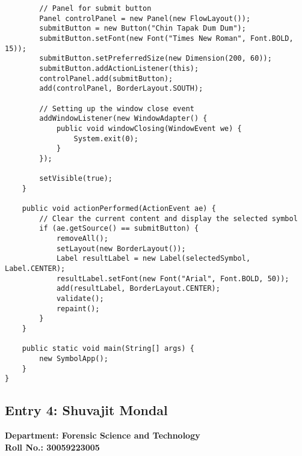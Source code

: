 \documentclass[a4paper,12pt]{article}
\begin{document}
\begin{verbatim}
        // Panel for submit button
        Panel controlPanel = new Panel(new FlowLayout());
        submitButton = new Button("Chin Tapak Dum Dum");
        submitButton.setFont(new Font("Times New Roman", Font.BOLD, 15));
        submitButton.setPreferredSize(new Dimension(200, 60));
        submitButton.addActionListener(this);
        controlPanel.add(submitButton);
        add(controlPanel, BorderLayout.SOUTH);

        // Setting up the window close event
        addWindowListener(new WindowAdapter() {
            public void windowClosing(WindowEvent we) {
                System.exit(0);
            }
        });

        setVisible(true);
    }

    public void actionPerformed(ActionEvent ae) {
        // Clear the current content and display the selected symbol
        if (ae.getSource() == submitButton) {
            removeAll();
            setLayout(new BorderLayout());
            Label resultLabel = new Label(selectedSymbol, Label.CENTER);
            resultLabel.setFont(new Font("Arial", Font.BOLD, 50));
            add(resultLabel, BorderLayout.CENTER);
            validate();
            repaint();
        }
    }

    public static void main(String[] args) {
        new SymbolApp();
    }
}
\end{verbatim}
\newpage

\subsection{Entry 4: Shuvajit Mondal}
\textbf{Department: Forensic Science and Technology} \\
\textbf{Roll No.: 30059223005} \\
\end{document}
